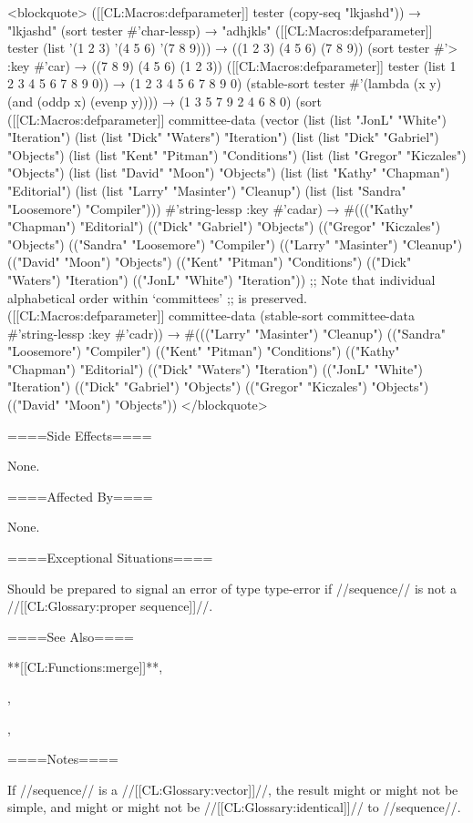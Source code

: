 <blockquote> ([[CL:Macros:defparameter]] tester (copy-seq "lkjashd")) → "lkjashd" (sort tester #'char-lessp) → "adhjkls" ([[CL:Macros:defparameter]] tester (list '(1 2 3) '(4 5 6) '(7 8 9))) → ((1 2 3) (4 5 6) (7 8 9)) (sort tester #'> :key #'car) → ((7 8 9) (4 5 6) (1 2 3)) ([[CL:Macros:defparameter]] tester (list 1 2 3 4 5 6 7 8 9 0)) → (1 2 3 4 5 6 7 8 9 0) (stable-sort tester #'(lambda (x y) (and (oddp x) (evenp y)))) → (1 3 5 7 9 2 4 6 8 0) (sort ([[CL:Macros:defparameter]] committee-data (vector (list (list "JonL" "White") "Iteration") (list (list "Dick" "Waters") "Iteration") (list (list "Dick" "Gabriel") "Objects") (list (list "Kent" "Pitman") "Conditions") (list (list "Gregor" "Kiczales") "Objects") (list (list "David" "Moon") "Objects") (list (list "Kathy" "Chapman") "Editorial") (list (list "Larry" "Masinter") "Cleanup") (list (list "Sandra" "Loosemore") "Compiler"))) #'string-lessp :key #'cadar) → #((("Kathy" "Chapman") "Editorial") (("Dick" "Gabriel") "Objects") (("Gregor" "Kiczales") "Objects") (("Sandra" "Loosemore") "Compiler") (("Larry" "Masinter") "Cleanup") (("David" "Moon") "Objects") (("Kent" "Pitman") "Conditions") (("Dick" "Waters") "Iteration") (("JonL" "White") "Iteration")) ;; Note that individual alphabetical order within `committees' ;; is preserved. ([[CL:Macros:defparameter]] committee-data (stable-sort committee-data #'string-lessp :key #'cadr)) → #((("Larry" "Masinter") "Cleanup") (("Sandra" "Loosemore") "Compiler") (("Kent" "Pitman") "Conditions") (("Kathy" "Chapman") "Editorial") (("Dick" "Waters") "Iteration") (("JonL" "White") "Iteration") (("Dick" "Gabriel") "Objects") (("Gregor" "Kiczales") "Objects") (("David" "Moon") "Objects")) </blockquote>

====Side Effects====

None.

====Affected By====

None.

====Exceptional Situations====

Should be prepared to signal an error of type type-error if //sequence// is not a //[[CL:Glossary:proper sequence]]//.

====See Also====

**[[CL:Functions:merge]]**,

{\secref\ConstantModification},

{\secref\TraversalRules},

{\secref\DestructiveOperations}

====Notes====

If //sequence// is a //[[CL:Glossary:vector]]//, the result might or might not be simple, and might or might not be //[[CL:Glossary:identical]]// to //sequence//.

 
